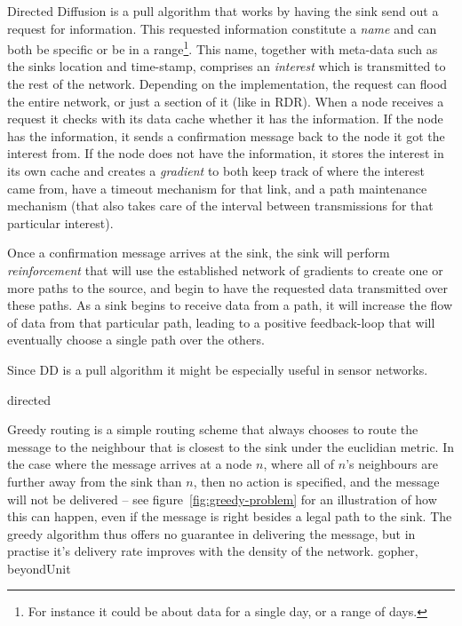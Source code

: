 \begin{description}
{Directed Diffusion is a pull algorithm that works by having the sink send out a request for information. This requested information constitute a \emph{name} and can both be specific or be in a range\footnote{For instance it could be about data for a single day, or a range of days.}. This name, together with meta-data such as the sinks location and time-stamp, comprises an \emph{interest} which is transmitted to the rest of the network. Depending on the implementation, the request can flood the entire network, or just a section of it (like in RDR). When a node receives a request it checks with its data cache whether it has the information. If the node has the information, it sends a confirmation message back to the node it got the interest from. If the node does not have the information, it stores the interest in its own cache and creates a \emph{gradient} to both keep track of where the interest came from, have a timeout mechanism for that link, and a path maintenance mechanism (that also takes care of the interval between transmissions for that particular interest). 

Once a confirmation message arrives at the sink, the sink will perform \emph{reinforcement} that will use the established network of gradients to create one or more paths to the source, and begin to have the requested data transmitted over these paths. As a sink begins to receive data from a path, it will increase the flow of data from that particular path, leading to a positive feedback-loop that will eventually choose a single path over the others.

Since DD is a pull algorithm it might be especially useful in sensor networks.}
{directed}


{\label{section:greedy}Greedy routing is a simple routing scheme that always chooses to route the message to the neighbour that is closest to the sink under the euclidian metric. In the case where the message arrives at a node $n$, where all of $n$'s neighbours are further away from the sink than $n$, then no action is specified, and the message will not be delivered -- see figure~\ref{fig:greedy-problem} for an illustration of how this can happen, even if the message is right besides a legal path to the sink. The greedy algorithm thus offers no guarantee in delivering the message, but in practise it's delivery rate improves with the density of the network.}
{gopher, beyondUnit}


\end{description}
